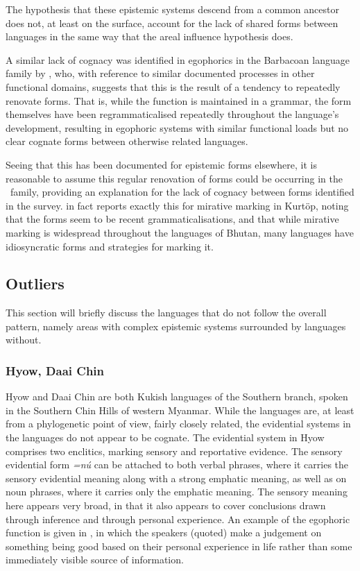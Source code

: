 The hypothesis that these epistemic systems descend from a common ancestor does not, at least on the surface, account for the lack of shared forms between languages in the same way that the areal influence hypothesis does.

A similar lack of cognacy was identified in egophorics in the Barbacoan language family by , who, with reference to similar documented processes in other functional domains, suggests that this is the result of a tendency to repeatedly renovate forms. That is, while the function is maintained in a grammar, the form themselves have been regrammaticalised repeatedly throughout the language's development, resulting in egophoric systems with similar functional loads but no clear cognate forms between otherwise related languages.

Seeing that this has been documented for epistemic forms elsewhere, it is reasonable to assume this regular renovation of forms could be occurring in the \lfam\ family, providing an explanation for the lack of cognacy between forms identified in the survey.  in fact reports exactly this for mirative marking in Kurtöp, noting that the forms seem to be recent grammaticalisations, and that while mirative marking is widespread throughout the languages of Bhutan, many languages have idiosyncratic forms and strategies for marking it.

\subsection{Outliers}\label{ss:History:Outliers}
This section will briefly discuss the languages that do not follow the overall pattern, namely areas with complex epistemic systems surrounded by languages without. 

\subsubsection{Hyow, Daai Chin}
Hyow \cite{Zakaria2018} and Daai Chin \cite{SoHartmann2009} are both Kukish languages of the Southern branch, spoken in the Southern Chin Hills of western Myanmar. While the languages are, at least from a phylogenetic point of view, fairly closely related, the evidential systems in the languages do not appear to be cognate.
The evidential system in Hyow \cite[Kukish: Myanmar,][486]{Zakaria2018} comprises two enclitics, marking sensory and reportative evidence. The sensory evidential form \textit{=nú} can be attached to both verbal phrases, where it carries the sensory evidential meaning along with a strong emphatic meaning, as well as on noun phrases, where it carries only the emphatic meaning. The sensory meaning here appears very broad, in that it also appears to cover conclusions drawn through inference and through personal experience. An example of the egophoric function is given in , in which the speakers (quoted) make a judgement on something being good based on their personal experience in life rather than some immediately visible source of information.

